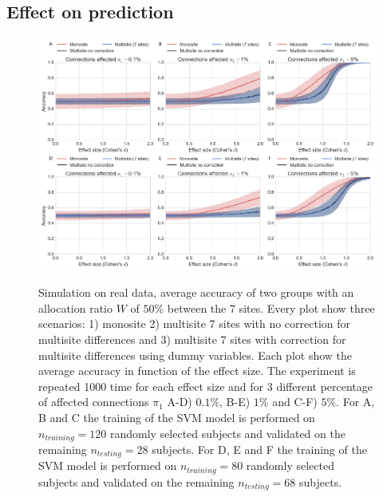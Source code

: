\documentclass[authoryear]{elsarticle}
\begin{document}
\subsection{Effect on prediction}

\begin{figure}[tbp]
\centering
\captionsetup[subfloat]{labelformat=empty}
{\includegraphics[width=\textwidth]{../figures/prediction_effectsize.png}}
\caption{
Simulation on real data, average accuracy of two groups with an allocation ratio $W$ of $50\%$ between the 7 sites. Every plot show three scenarios: 1) monosite 2) multisite 7 sites with no correction for multisite differences and 3) multisite 7 sites with correction for multisite differences using dummy variables. Each plot show the average accuracy in function of the effect size.  The experiment is repeated 1000 time for each effect size and for 3 different percentage of affected connections $\pi_1$ A-D) $0.1\%$, B-E) $1\%$ and C-F) $5\%$. For A, B and C the training of the SVM model is performed on $n_{training}=120$ randomly selected subjects and validated on the remaining $n_{testing}=28$ subjects. For D, E and F the training of the SVM model is performed on
$n_{training}=80$ randomly selected subjects and validated on the remaining $n_{testing}=68$ subjects.
}
\label{fig_prediction_sampeffect}
\end{figure}
\end{document}
